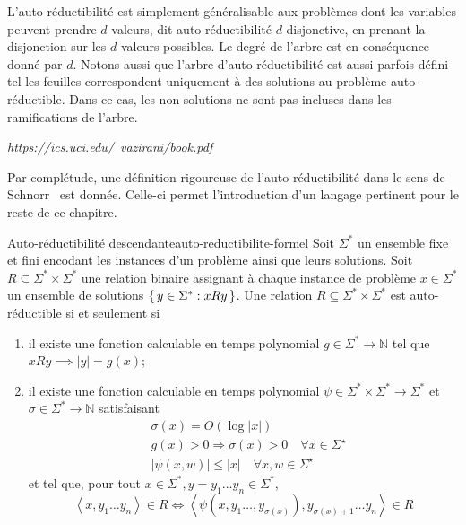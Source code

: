 L'auto-réductibilité est simplement généralisable aux problèmes dont les variables peuvent prendre $d$ valeurs, dit auto-réductibilité $d$-disjonctive, en prenant la disjonction sur les $d$ valeurs possibles. Le degré de l'arbre est en conséquence donné par $d$. Notons aussi que l'arbre d'auto-réductibilité est aussi parfois défini tel les feuilles correspondent uniquement à des solutions au problème auto-réductible. Dans ce cas, les non-solutions ne sont pas incluses dans les ramifications de l'arbre.

\textcolor{mydarkred}{\textit{https://ics.uci.edu/~vazirani/book.pdf}}


Par complétude, une définition rigoureuse de l'auto-réductibilité dans le sens de Schnorr~\cite{schnorrOptimalAlgorithmsSelfReducible1976} est donnée. Celle-ci permet l'introduction d'un langage pertinent pour le reste de ce chapitre.
\begin{maindefinition}{Auto-réductibilité descendante}{auto-reductibilite-formel}
    Soit $\Sigma^{*}$ un ensemble fixe et fini encodant les instances d'un problème ainsi que leurs solutions. Soit $R \subseteq \Sigma^{*} \times \Sigma^{*}$ une relation binaire assignant à chaque instance de problème $x \in \Sigma^{*}$ un ensemble de solutions $\set{ y \in \Sigma^{*} : xRy }$. Une relation $R \subseteq \Sigma^{*} \times \Sigma^{*}$ est auto-réductible si et seulement si
    \begin{enumerate}
        \item il existe une fonction calculable en temps polynomial $g \in \Sigma^{*} \to \mathbb{N}$ tel que $xRy \implies \lvert y \rvert = g(x)$;
        \item il existe une fonction calculable en temps polynomial $\psi \in \Sigma^{*} \times \Sigma^{*} \to \Sigma^{*}$ et $\sigma \in \Sigma^{*} \to \mathbb{N}$ satisfaisant
        \begin{align*}
            & \sigma(x)=O(\log |x|) \\
            & g(x)>0 \Rightarrow \sigma(x)>0 \quad \forall x \in \Sigma^{\star} \\
            & |\psi(x, w)| \leqslant|x| \quad \forall x, w \in \Sigma^{\star}
        \end{align*}
        et tel que, pour tout $x \in \Sigma^{*}, y=y_1 \ldots y_n \in \Sigma^{*}$, 
        \begin{equation*}
            \left\langle x, y_1 \ldots y_n \right\rangle \in R \Leftrightarrow \left\langle \psi \left( x, y_1 \ldots, y_{\sigma(x)} \right), y_{\sigma(x)+1} \ldots y_n \right\rangle \in R
        \end{equation*}
    \end{enumerate}
\end{maindefinition}

